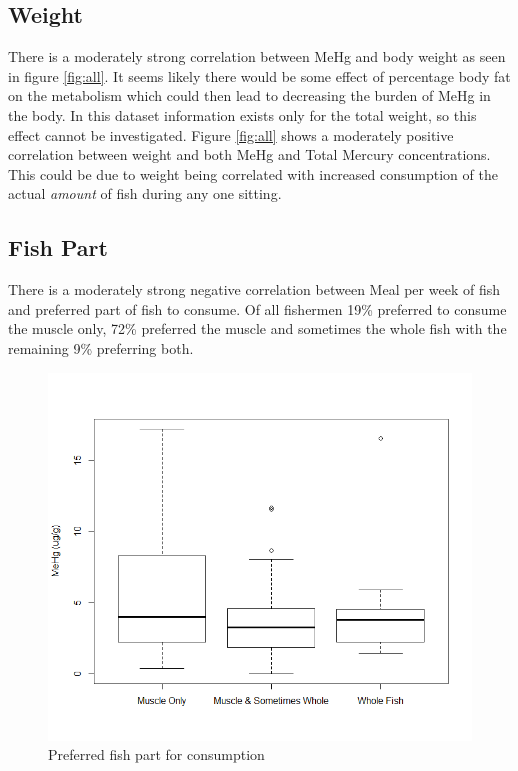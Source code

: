 \documentclass[twocolumn, 12pt]{report}
\begin{document}
\subsection{Weight}

There is a moderately strong correlation between MeHg and body weight as seen in figure \ref{fig:all}. It seems likely there would be some effect of percentage body fat on the metabolism which could then lead to decreasing the burden of MeHg in the body. In this dataset information exists only for the total weight, so this effect cannot be investigated. Figure \ref{fig:all} shows a moderately positive correlation between weight and both MeHg and Total Mercury concentrations. This could be due to weight being correlated with increased consumption of the actual \emph{amount} of fish during any one sitting.  

\subsection{Fish Part}

There is a moderately strong negative correlation between Meal per week of fish and preferred part of fish to consume. Of all fishermen 19\% preferred to consume the muscle only, 72\% preferred the muscle and sometimes the whole fish with the remaining 9\% preferring both.

\begin{figure}
	\includegraphics[width=\linewidth]{res/me_fishpart.png}
	\caption{Preferred fish part for consumption}
	\label{fig:fishpart}
\end{figure}
\end{document}
